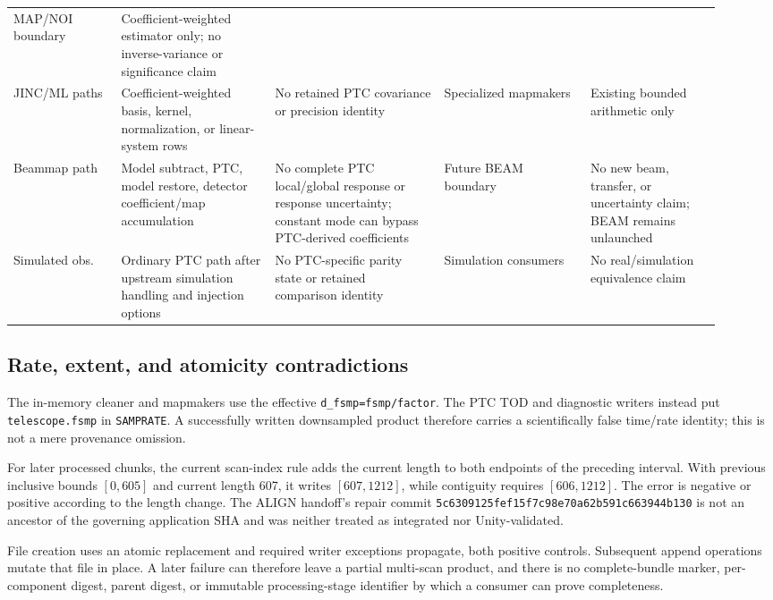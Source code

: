 \documentclass[11pt]{article}
\newcommand{\code}[1]{\nolinkurl{#1}}
\begin{document}
\begin{longtable}{L{0.145\linewidth}L{0.20\linewidth}L{0.22\linewidth}L{0.19\linewidth}L{0.17\linewidth}}
MAP/NOI boundary &
Coefficient-weighted estimator only; no inverse-variance or significance claim\\
JINC/ML paths &
Coefficient-weighted basis, kernel, normalization, or linear-system rows &
No retained PTC covariance or precision identity &
Specialized mapmakers &
Existing bounded arithmetic only\\
Beammap path &
Model subtract, PTC, model restore, detector coefficient/map accumulation &
No complete PTC local/global response or response uncertainty; constant mode
can bypass PTC-derived coefficients &
Future BEAM boundary &
No new beam, transfer, or uncertainty claim; BEAM remains unlaunched\\
Simulated obs. &
Ordinary PTC path after upstream simulation handling and injection options &
No PTC-specific parity state or retained comparison identity &
Simulation consumers &
No real/simulation equivalence claim\\
\bottomrule
\end{longtable}

\subsection{Rate, extent, and atomicity contradictions}

The in-memory cleaner and mapmakers use the effective
\code{d_fsmp=fsmp/factor}.  The PTC TOD and diagnostic writers instead put
\code{telescope.fsmp} in \code{SAMPRATE}.  A successfully written
downsampled product therefore carries a scientifically false time/rate
identity; this is not a mere provenance omission.

For later processed chunks, the current scan-index rule adds the current
length to both endpoints of the preceding interval.  With previous inclusive
bounds \([0,605]\) and current length 607, it writes \([607,1212]\), while
contiguity requires \([606,1212]\).  The error is negative or positive
according to the length change.  The ALIGN handoff's repair commit
\code{5c6309125fef15f7c98e70a62b591c663944b130} is not an ancestor of the
governing application SHA and was neither treated as integrated nor
Unity-validated.

File creation uses an atomic replacement and required writer exceptions
propagate, both positive controls.  Subsequent append operations mutate that
file in place.  A later failure can therefore leave a partial multi-scan
product, and there is no complete-bundle marker, per-component digest, parent
digest, or immutable processing-stage identifier by which a consumer can
prove completeness.
\end{document}
